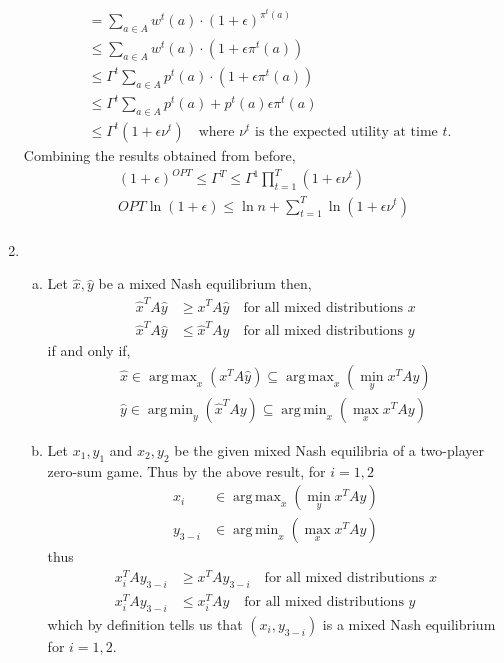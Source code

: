 \documentclass[a4paper,12pt]{article}
\theoremstyle{definition}
\DeclareMathOperator*{\argmax}{arg\,max}
\DeclareMathOperator*{\argmin}{arg\,min}
\begin{document}
\begin{enumerate}
\begin{align*}
&= \sum_{a \in A}w^{t}(a)\cdot (1+\epsilon)^{\pi^t(a)}\\
&\leq \sum_{a \in A}w^{t}(a)\cdot (1+\epsilon\pi^t(a))\\
&\leq \Gamma^t\sum_{a \in A}p^{t}(a)\cdot (1+\epsilon\pi^t(a))\\
&\leq \Gamma^t\sum_{a \in A}p^{t}(a)+p^{t}(a)\epsilon\pi^t(a)\\
&\leq \Gamma^t(1+\epsilon\nu^t)\quad \text{where $\nu^t$ is the expected utility at time $t$.}
\end{align*}
Combining the results obtained from before,
\begin{align*}
(1+\epsilon)^{OPT}\leq \Gamma^T\leq \Gamma^1\prod_{t=1}^{T}(1+\epsilon \nu^t)\\
OPT \ln (1+\epsilon)\leq  \ln n + \sum_{t=1}^{T}\ln (1+\epsilon \nu^t)\\
\end{align*}

\item 
\begin{enumerate}[(a)]
\item %
Let $\hat{x}, \hat{y}$ be a mixed Nash equilibrium then,
\begin{align}
\hat{x}^TA\hat{y}&\geq x^TA\hat{y} \quad \text{for all mixed distributions $x$}\\
\hat{x}^TA\hat{y}&\leq \hat{x}^TAy \quad \text{for all mixed distributions $y$}
\end{align}
if and only if,
\begin{align*}
\hat{x}\in\argmax_x \left(x^TA \hat{y}\right)\subseteq\argmax_x\left(\min_yx^TAy\right)\\
\hat{y}\in\argmin_y \left(\hat{x}^T Ay\right)\subseteq\argmin_x\left(\max_xx^TAy\right)
\end{align*}

\item Let $x_1,y_1$ and $x_2,y_2$ be the given mixed Nash equilibria of a two-player zero-sum game. Thus by the above result, for $i=1,2$
\begin{align*}
x_i &\in \argmax_x\left(\min_yx^TAy\right)\\
y_{3-i} & \in\argmin_x\left(\max_xx^TAy\right)
\end{align*}
thus
\begin{align*}
x_i^TAy_{3-i}&\geq x^TAy_{3-i} \quad \text{for all mixed distributions $x$}\\
x_i^TAy_{3-i}&\leq x_i^TAy_{} \quad \text{for all mixed distributions $y$}
\end{align*}
which by definition tells us that $(x_i,y_{3-i})$ is a mixed Nash equilibrium for $i=1,2$.
\end{enumerate}


\end{enumerate}
\end{document}
